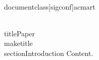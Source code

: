 \\documentclass[sigconf]{acmart}
\begin{document}
\\title{Paper}
\\maketitle
\\section{Introduction}
Content.
\
\end{document}
